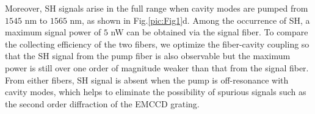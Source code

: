\documentclass[a4paper,8pt,hyperref, twocolumn]{article}
\begin{document}
Moreover, SH signals arise in the full range when cavity modes are pumped from $1545$ nm to $1565$ nm, as shown in Fig.\ref{pic:Fig1}d.
Among the occurrence of SH, a maximum signal power of $5$ nW can be obtained via the signal fiber. To compare the collecting efficiency of the two fibers, we optimize the fiber-cavity coupling so that the SH signal from the pump fiber is also observable but the maximum power is still over one order of magnitude weaker than that from the signal fiber. From either fibers, SH signal is absent when the pump is off-resonance with cavity modes, which helps to eliminate the possibility of spurious signals such as the second order diffraction of the EMCCD grating.

\end{document}
